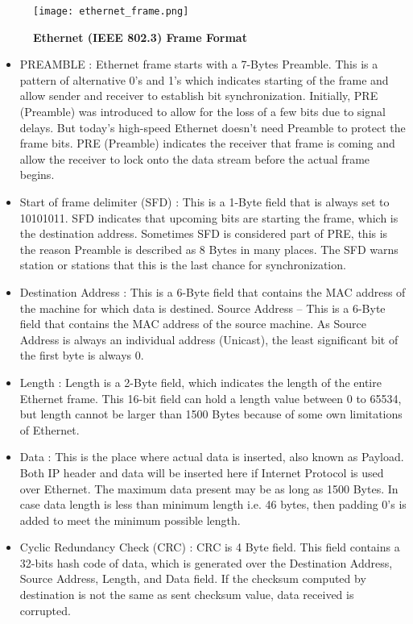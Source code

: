 \documentclass[12pt]{article}
\begin{document}
 \begin{figure}[ht]
\centering
\texttt{[image: ethernet\_frame.png]}
\caption{\textbf{Ethernet (IEEE 802.3) Frame Format}}
\label{ethernet_frame}
\end{figure}
\begin{itemize}

\item PREAMBLE : Ethernet frame starts with a 7-Bytes Preamble. This is a pattern of alternative 0’s and 1’s which indicates starting of the frame and allow sender and receiver to establish bit synchronization. Initially, PRE (Preamble) was introduced to allow for the loss of a few bits due to signal delays. But today’s high-speed Ethernet doesn’t need Preamble to protect the frame bits. PRE (Preamble) indicates the receiver that frame is coming and allow the receiver to lock onto the data stream before the actual frame begins.

\item Start of frame delimiter (SFD) : This is a 1-Byte field that is always set to 10101011. SFD indicates that upcoming bits are starting the frame, which is the destination address. Sometimes SFD is considered part of PRE, this is the reason Preamble is described as 8 Bytes in many places. The SFD warns station or stations that this is the last chance for synchronization.

\item Destination Address : This is a 6-Byte field that contains the MAC address of the machine for which data is destined.
Source Address – This is a 6-Byte field that contains the MAC address of the source machine. As Source Address is always an individual address (Unicast), the least significant bit of the first byte is always 0.

\item Length : Length is a 2-Byte field, which indicates the length of the entire Ethernet frame. This 16-bit field can hold a length value between 0 to 65534, but length cannot be larger than 1500 Bytes because of some own limitations of Ethernet.

\item Data : This is the place where actual data is inserted, also known as Payload. Both IP header and data will be inserted here if Internet Protocol is used over Ethernet. The maximum data present may be as long as 1500 Bytes. In case data length is less than minimum length i.e. 46 bytes, then padding 0’s is added to meet the minimum possible length.

\item Cyclic Redundancy Check (CRC) :  CRC is 4 Byte field. This field contains a 32-bits hash code of data, which is generated over the Destination Address, Source Address, Length, and Data field. If the checksum computed by destination is not the same as sent checksum value, data received is corrupted.

\end{itemize}
\end{document}
